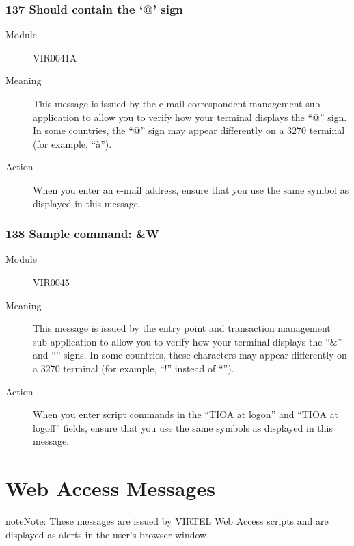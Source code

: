 \documentclass[letterpaper,10pt,english]{sphinxmanual}
\begin{document}
\subsubsection{137 Should contain the ‘@’ sign}
\label{\detokenize{messages:should-contain-the-sign}}\begin{description}
\item[{Module}] \leavevmode
VIR0041A

\item[{Meaning}] \leavevmode
This message is issued by the e-mail correspondent management sub-application to allow you to verify how your terminal displays the “@” sign. In some countries, the “@” sign may appear differently on a 3270 terminal (for example, “à”).

\item[{Action}] \leavevmode
When you enter an e-mail address, ensure that you use the same symbol as displayed in this message.

\end{description}


\subsubsection{138 Sample command: \&\textbar{}W}
\label{\detokenize{messages:sample-command-w}}\begin{description}
\item[{Module}] \leavevmode
VIR0045

\item[{Meaning}] \leavevmode
This message is issued by the entry point and transaction management sub-application to allow you to verify how your terminal displays the “\&” and “\textbar{}” signs. In some countries, these characters may appear differently on a 3270 terminal (for example, “!” instead of “\textbar{}”).

\item[{Action}] \leavevmode
When you enter script commands in the “TIOA at logon” and “TIOA at logoff” fields, ensure that you use the same symbols as displayed in this message.

\end{description}


\section{Web Access Messages}
\label{\detokenize{messages:web-access-messages}}
\begin{sphinxadmonition}{note}{Note:}
These messages are issued by VIRTEL Web Access scripts and are displayed as alerts in the user’s browser window.
\end{sphinxadmonition}
\end{document}
